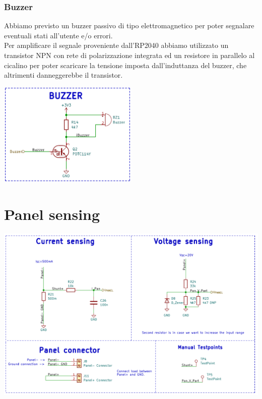 \hypertarget{buzzer}{%
\subsubsection{\texorpdfstring{Buzzer}{Buzzer}}\label{buzzer}}

Abbiamo previsto un buzzer passivo di tipo elettromagnetico per poter
segnalare eventuali stati all'utente e/o errori.\\
Per amplificare il segnale proveniente dall'RP2040 abbiamo utilizzato un transistor NPN con
rete di polarizzazione integrata ed un resistore in parallelo al
cicalino per poter scaricare la tensione imposta dall'induttanza del
buzzer, che altrimenti danneggerebbe il transistor.

\begin{center}
\includegraphics[width=0.5\textwidth]{figures/image38.png}
\captionsetup{type=figure}
\end{center}

\hypertarget{panel-sensing}{%
\section{\texorpdfstring{Panel sensing}{ Panel sensing}}\label{panel-sensing}}

\begin{center}
\includegraphics[scale=0.5]{figures/image24.png}
\captionsetup{type=figure}
\end{center}

